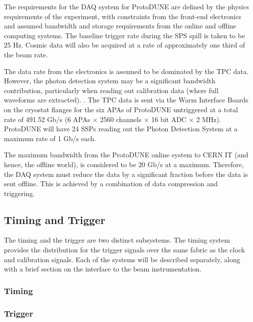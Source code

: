 The requirements for the DAQ system for ProtoDUNE are defined
by the physics requirements of the experiment, with constraints from the
front-end electronics and assumed bandwidth and storage requirements
from the online and offline computing systems.  The baseline trigger
rate during the SPS spill is taken to be 25 Hz.  Cosmic data will also
be acquired at a rate of approximately one third of the beam rate.

The data rate from the electronics is assumed to be dominated by the
TPC data.  However, the photon detection system may be a significant
bandwidth contribution, particularly when reading out calibration data
(where full waveforms are extracted).  .
The TPC data is sent via the Warm Interface Boards on the cryostat flanges
for the six APAs of ProtoDUNE untriggered at a total rate of 491.52 Gb/s
(6 APAs $\times$ 2560 channels $\times$ 16 bit ADC $\times$ 2 MHz).
ProtoDUNE will have 24 SSPs reading out the Photon Detection System at
a maximum rate of 1 Gb/s each.

The maximum bandwidth from the ProtoDUNE online system to CERN IT (and
hence, the offline world), is considered to be 20 Gb/s at a maximum.
Therefore, the DAQ system must reduce the data by a significant fraction
before the data is sent offline.  This is achieved by a combination of
data compression and triggering.


\subsection{Timing and Trigger}
\label{sec:daq_time}

The timing and the trigger are two distinct subsystems.  The timing
system provides the distribution for the trigger signals over the same
fabric as the clock and calibration signals.  Each of the systems will
be described separately, along with a brief section on the interface to
the beam instrumentation.

\subsubsection{Timing}



\subsubsection{Trigger}

